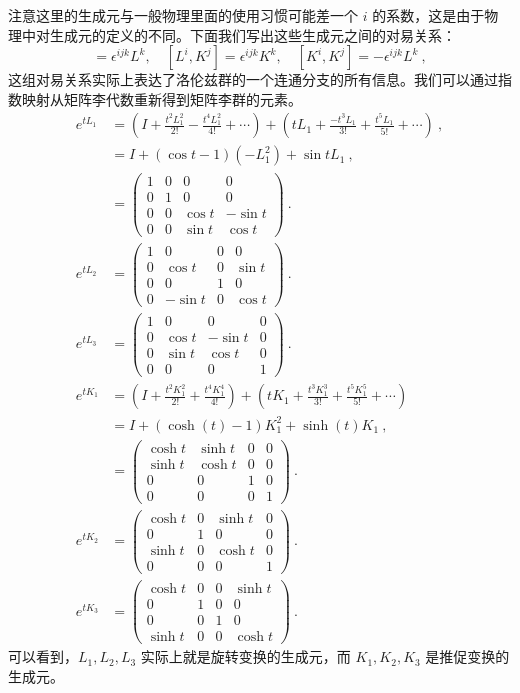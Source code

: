 注意这里的生成元与一般物理里面的使用习惯可能差一个 $i$ 的系数，这是由于物理中对生成元的定义的不同。下面我们写出这些生成元之间的对易关系：
\begin{equation}
[L^i,L^j]=\epsilon^{ijk}L^k,\quad
[L^i,K^j]=\epsilon^{ijk}K^k,\quad
[K^i,K^j]=-\epsilon^{ijk}L^k~,
\end{equation}
这组对易关系实际上表达了洛伦兹群的一个连通分支的所有信息。我们可以通过指数映射从矩阵李代数重新得到矩阵李群的元素。
\begin{equation}
\begin{aligned}
e^{tL_1}&=(I+\frac{t^2L_1^2}{2!}-\frac{t^4L_1^2}{4!}+\cdots)+(tL_1+\frac{-t^3L_1}{3!}+\frac{t^5L_1}{5!}+\cdots)~,\\
&=I+(\cos t-1)(-L_1^2)+\sin t L_1~,\\
&=
\begin{pmatrix}
1 & 0 & 0 & 0\\
0 & 1 & 0 & 0\\
0 & 0 & \cos t & -\sin t\\
0 & 0 & \sin t & \cos t
\end{pmatrix}~.\\
e^{tL_2}&=
\begin{pmatrix}
1 & 0 & 0 & 0\\
0 & \cos t & 0 & \sin t\\
0 & 0 & 1 & 0\\
0 & -\sin t & 0 & \cos t
\end{pmatrix}~.\\
e^{tL_3}&=
\begin{pmatrix}
1 & 0 & 0 & 0\\
0 & \cos t & -\sin t & 0\\
0 & \sin t & \cos t & 0\\
0 & 0 & 0 & 1
\end{pmatrix}~.
\\
e^{tK_1}&=(I+\frac{t^2K_1^2}{2!}+\frac{t^4K_1^4}{4!})+(tK_1+\frac{t^3K_1^3}{3!}+\frac{t^5K_1^5}{5!}+\cdots)\\
&=I+(\cosh(t)-1)K_1^2+\sinh(t) K_1~,\\
&=\begin{pmatrix}
\cosh t & \sinh t & 0 & 0\\
\sinh t & \cosh t & 0 & 0\\
0 & 0 & 1 & 0\\
0 & 0 & 0 & 1
\end{pmatrix}~.
\\
e^{t K_2}&=\begin{pmatrix}
\cosh t & 0 & \sinh t & 0\\
0 & 1 & 0 & 0\\
\sinh t & 0 & \cosh t & 0\\
0 & 0 & 0 & 1
\end{pmatrix}~.
\\
e^{t K_3}&=\begin{pmatrix}
\cosh t & 0 & 0 & \sinh t\\
0 & 1 & 0 & 0\\
0 & 0 & 1 & 0\\
\sinh t & 0 & 0 & \cosh t
\end{pmatrix}~.
\end{aligned}
\end{equation}
可以看到，$L_1,L_2,L_3$ 实际上就是旋转变换的生成元，而 $K_1,K_2,K_3$ 是推促变换的生成元。
